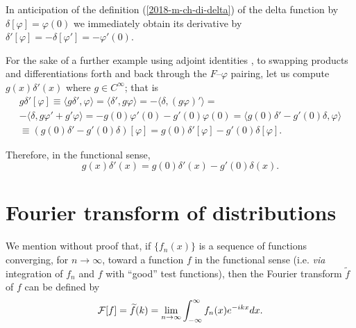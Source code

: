 {
\color{blue}
\bexample

In anticipation of the definition (\ref{2018-m-ch-di-delta}) of the delta function by $\delta [\varphi ]=\varphi (0)$
we immediately obtain its derivative by $\delta' [\varphi ]= - \delta[\varphi '  ]=-\varphi' (0)$.


For the sake of a further example using   adjoint identities
,
to swapping products and differentiations forth and back
through the $F$--$\varphi$ pairing, let us compute
$g(x)\delta' (x)$ where $g \in C^\infty$; that is
\begin{equation}
\begin{split}
g \delta' [\varphi ] \equiv
\langle g \delta'   , \varphi \rangle
=
\langle \delta'   , g  \varphi \rangle
 =
- \langle \delta   , (g  \varphi )'\rangle
 =  \\
- \langle \delta   ,  g  \varphi  '+ g'  \varphi  \rangle
 =
-  g(0)  \varphi ' (0) - g'(0)  \varphi(0)
 =
  \langle g(0) \delta '   -  g'(0)\delta , \varphi   \rangle
\\ \equiv
\left(g(0)\delta ' -g'(0)\delta \right) [\varphi ]
= g(0)\delta '[\varphi] -g'(0)\delta [\varphi ]
.
\end{split}
\end{equation}
\eexample
}
Therefore,  in the functional sense,
\begin{equation}
g(x)\delta' (x)=g(0) \delta '(x)   -  g'(0)\delta (x) .
\label{2012-m-ch-di-sederi}
\end{equation}




\section{Fourier transform  of distributions}
\label{2012-m-ch-di-ftgeneraldefcon}

We mention without proof that, if $\{ f_n(x)\}$ is a sequence of functions converging, for $n\rightarrow \infty$,
toward a function $f$ in the functional sense (i.e. {\it via}
integration of $f_n$ and $f$ with ``good'' test functions),
then the Fourier transform $\widetilde f$ of $f$ can be defined by \cite{Lighthill,Howell,doi:10.1080/0020739900210418}
\begin{equation}
\begin{split}
 {\cal F}[f]=\widetilde{f}(k)= \lim_{n\rightarrow \infty}
 \int_{-\infty}^\infty  f_n(x) e^{-i{kx}} dx
.
\end{split}
\end{equation}

